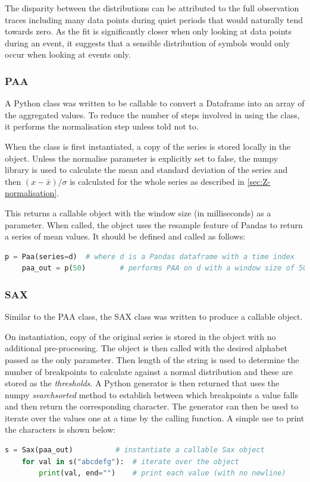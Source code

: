 \documentclass[../report.tex]{subfiles}
\begin{document}
	The disparity between the distributions can be attributed to the full observation traces including many data points during quiet periods that would naturally tend towards zero.  As the fit is significantly closer when only looking at data points during an event, it suggests that a sensible distribution of symbols would only occur when looking at events only.

\subsubsection{PAA}
	A Python class was written to be callable to convert a Dataframe into an array of the aggregated values.  To reduce the number of steps involved in using the class, it performs the normalisation step unless told not to.
	
	
	
	When the class is first instantiated, a copy of the series is stored locally in the object.  Unless the normalise parameter is explicitly set to false, the numpy library is used to calculate the mean and standard deviation of the series and then $(x - \bar{x}) / \sigma$ is calculated for the whole series as described in \cref{sec:Z-normalisation}.
	
	This returns a callable object with the window size (in milliseconds) as a parameter.  When called, the object uses the resample feature of Pandas to return a series of mean values.	It should be defined and called as follows:
	
\begin{lstlisting}[language=Python]
	p = Paa(series=d)  # where d is a Pandas dataframe with a time index
	paa_out = p(50)        # performs PAA on d with a window size of 50ms
\end{lstlisting}

\subsubsection{SAX}
	Similar to the PAA class, the SAX class was written to produce a callable object.

	
	
	On instantiation, copy of the original series is stored in the object with no additional pre-processing.  The object is then called with the desired alphabet passed as the only parameter.  Then length of the string is used to determine the number of breakpoints to calculate against a normal distribution and these are stored as the \textit{thresholds}.  A Python generator is then returned that uses the numpy \textit{searchsorted} method to establish between which breakpoints a value falls and then return the corresponding character.  The generator can then be used to iterate over the values one at a time by the calling function.  A simple use to print the characters is shown below:
	
\begin{lstlisting}[language=Python]
	s = Sax(paa_out)          # instantiate a callable Sax object
	for val in s("abcdefg"):  # iterate over the object
	    print(val, end="")    # print each value (with no newline)
\end{lstlisting}
	
\end{document}
